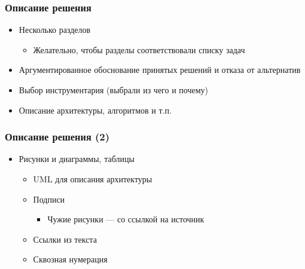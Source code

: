 \documentclass[xetex,mathserif,serif]{beamer}
\begin{document}
    \begin{frame}
        \frametitle{Описание решения}
        \begin{itemize}
            \item Несколько разделов
            \begin{itemize}
                \item Желательно, чтобы разделы соответствовали списку задач
            \end{itemize}
            \item Аргументированное обоснование принятых решений и отказа от альтернатив
            \item Выбор инструментария (выбрали из чего и почему)
            \item Описание архитектуры, алгоритмов и т.п.
        \end{itemize}
    \end{frame}

    \begin{frame}
        \frametitle{Описание решения (2)}
        \begin{itemize}
            \item Рисунки и диаграммы, таблицы
            \begin{itemize}
                \item UML для описания архитектуры
                \item Подписи
                \begin{itemize}
                    \item Чужие рисунки --- со ссылкой на источник
                \end{itemize}
                \item Ссылки из текста
                \item Сквозная нумерация
            \end{itemize}
        \end{itemize}
    \end{frame}
\end{document}
